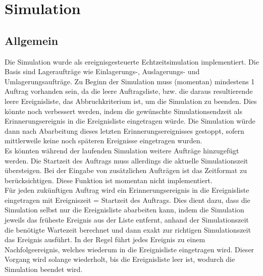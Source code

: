 \section{Simulation}
\subsection{Allgemein}
Die Simulation wurde als ereignisgesteuerte Echtzeitsimulation implementiert. Die Basis sind Lageraufträge wie Einlagerungs-, Auslagerungs- und Umlagerungsaufträge. Zu Beginn der Simulation muss (momentan) mindestens 1 Auftrag vorhanden sein, da die leere Auftragsliste, bzw. die daraus resultierende leere Ereignisliste, das Abbruchkriterium ist, um die Simulation zu beenden. Dies könnte noch verbessert werden, indem die gewünschte Simulationsendzeit als Erinnerungsereignis in die Ereignisliste eingetragen würde. Die Simulation würde dann nach Abarbeitung dieses letzten Erinnerungsereignisses gestoppt, sofern mittlerweile keine noch späteren Ereignisse eingetragen wurden. \\
Es könnten während der laufenden Simulation weitere Aufträge hinzugefügt werden. Die Startzeit des Auftrags muss allerdings die aktuelle Simulationszeit übersteigen. Bei der Eingabe von zusätzlichen Aufträgen ist das Zeitformat zu berücksichtigen. Diese Funktion ist momentan nicht implementiert.
\\
Für jeden zukünftigen Auftrag wird ein Erinnerungsereignis in die Ereignisliste eingetragen mit Ereigniszeit = Startzeit des Auftrags. Dies dient dazu, dass die Simulation selbst nur die Ereignisliste abarbeiten kann, indem die Simulation jeweils das früheste Ereignis aus der Liste entfernt, anhand der Simulationszeit die benötigte Wartezeit berechnet und dann exakt zur richtigen Simulationszeit das Ereignis ausführt. In der Regel führt jedes Ereignis zu einem Nachfolgeereignis, welches
wiederum in die Ereignisliste eingetragen wird. Dieser Vorgang wird solange wiederholt, bis die Ereignisliste leer ist, wodurch die Simulation beendet wird.
%
